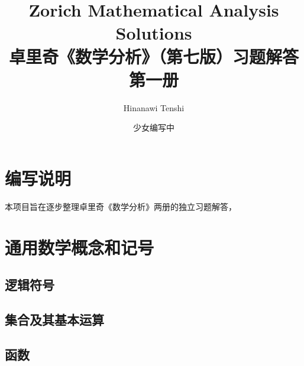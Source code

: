 \documentclass[UTF8,fontset=fandol,zihao=-4,a4paper,oneside,openany]{ctexbook}
\title{Zorich Mathematical Analysis\\[0.4em]Solutions\\[1em]
  \large 卓里奇《数学分析》（第七版）习题解答\quad 第一册}
\author{Hinanawi Tenshi}
\date{少女编写中}
\begin{document}
\frontmatter
\hypersetup{pageanchor=false}
\maketitle
\hypersetup{pageanchor=true}

\chapter*{编写说明}
本项目旨在逐步整理卓里奇《数学分析》两册的独立习题解答，
\tableofcontents
\mainmatter

\chapter{通用数学概念和记号}
\label{chap:b1-c1}
\section{逻辑符号}
\label{sec:b1-c1-s1}


\section{集合及其基本运算}
\label{sec:b1-c1-s2}



\section{函数}
\label{sec:b1-c1-s3}

\end{document}

